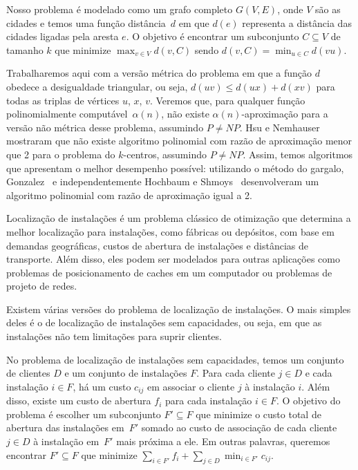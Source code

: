 \documentclass[12pt]{article}
\newcommand{\NP}{\mathit{NP}}
\begin{document}
Nosso problema é modelado como um grafo completo $G(V,E)$, onde $V$ são as cidades e temos uma função distância~$d$ em que $d(e)$ representa a distância das cidades ligadas pela aresta $e$. O objetivo é encontrar um subconjunto $C \subseteq V$ de tamanho $k$ que minimize $\max_{v\in V}d(v,C)$ sendo $d(v,C) = \min_{u\in C}d(vu)$.

Trabalharemos aqui com a versão métrica do problema em que a função $d$ obedece a desigualdade triangular, ou seja, $d(uv) \leq d(ux) + d(xv)$ para todas as triplas de vértices $u$, $x$, $v$. Veremos que, para qualquer função polinomialmente computável~$\alpha(n)$, não existe $\alpha(n)$-aproximação para a versão não métrica desse problema, assumindo $P\not=\NP$. Hsu e Nemhauser~\cite{HSU1979209} mostraram que não existe algoritmo polinomial com razão de aproximação menor que 2 para o problema do $k$-centros, assumindo $P\not=\NP$. Assim, temos algoritmos que apresentam o melhor desempenho possível: utilizando o método do gargalo, Gonzalez~\cite{GONZALEZ1985293} e independentemente Hochbaum e Shmoys~\cite{HochShmoys'85} desenvolveram um algoritmo polinomial com razão de aproximação igual a 2. 


Localização de instalações é um problema clássico de otimização que determina a melhor localização para instalações, como fábricas ou depósitos, com base em demandas geográficas, custos de abertura de instalações e distâncias de transporte. Além disso, eles podem ser modelados para outras aplicações como problemas de posicionamento de caches em um computador ou problemas de projeto de redes.

Existem várias versões do problema de localização de instalações. O mais simples deles é o de localização de instalações sem capacidades, ou seja, em que as instalações não tem limitações para suprir clientes.

No problema de localização de instalações sem capacidades, temos um conjunto de clientes $D$ e um conjunto de instalações $F$. Para cada cliente $j \in D$ e cada instalação $i \in F$, há um custo $c_{ij}$ em associar o cliente $j$ à instalação $i$. Além disso, existe um custo de abertura $f_i$ para cada instalação $i \in F$. O objetivo do problema é escolher um subconjunto $F' \subseteq F$ que minimize o custo total de abertura das instalações em~$F'$ somado ao custo de associação de cada cliente $j \in D$ à instalação em~$F'$ mais próxima a ele. Em outras palavras, queremos encontrar $F' \subseteq F$ que minimize $\sum_{i\in F'} f_i + \sum_{j \in D} \min_{i\in F'}c_{ij}$.
\end{document}

